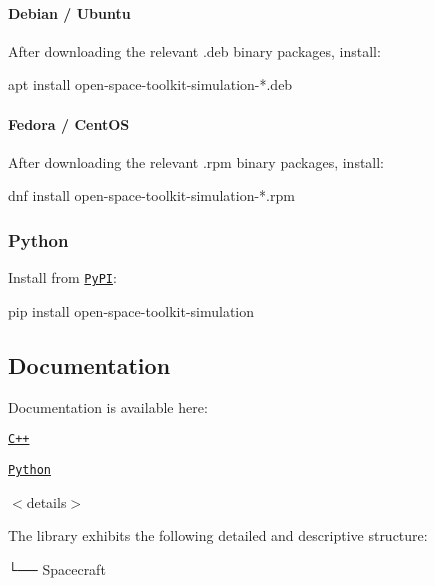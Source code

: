 \paragraph*{Debian / Ubuntu}

After downloading the relevant {\ttfamily .deb} binary packages, install\+:


\begin{DoxyCode}
apt install open-space-toolkit-simulation-*.deb
\end{DoxyCode}


\paragraph*{Fedora / Cent\+OS}

After downloading the relevant {\ttfamily .rpm} binary packages, install\+:


\begin{DoxyCode}
dnf install open-space-toolkit-simulation-*.rpm
\end{DoxyCode}


\subsubsection*{Python}

Install from \href{https://pypi.org/project/open-space-toolkit-simulation/}{\tt Py\+PI}\+:


\begin{DoxyCode}
pip install open-space-toolkit-simulation
\end{DoxyCode}


\subsection*{Documentation}

Documentation is available here\+:


\begin{DoxyItemize}
\item \href{https://open-space-collective.github.io/open-space-toolkit-simulation}{\tt C++}
\item \href{./bindings/python/docs}{\tt Python}
\end{DoxyItemize}

$<$details$>$

The library exhibits the following detailed and descriptive structure\+:


\begin{DoxyCode}
└── Spacecraft
\end{DoxyCode}


